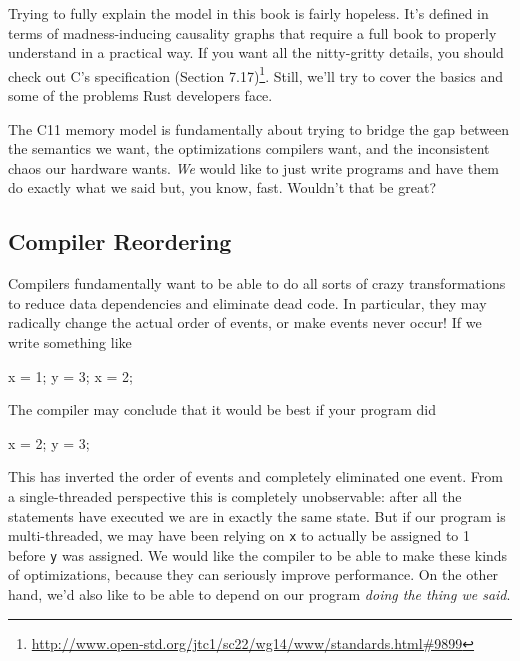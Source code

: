 \documentclass[a4paper,]{book}
\newenvironment{Shaded}{\begin{snugshade}}{\end{snugshade}}
\newcommand{\DecValTok}[1]{\textcolor[rgb]{0.00,0.00,0.81}{{#1}}}
\newcommand{\NormalTok}[1]{{#1}}
\renewcommand{\href}[2]{#2\footnote{\url{#1}}}
\begin{document}
Trying to fully explain the model in this book is fairly hopeless. It's
defined in terms of madness-inducing causality graphs that require a
full book to properly understand in a practical way. If you want all the
nitty-gritty details, you should check out
\href{http://www.open-std.org/jtc1/sc22/wg14/www/standards.html\#9899}{C's
specification (Section 7.17)}. Still, we'll try to cover the basics and
some of the problems Rust developers face.

The C11 memory model is fundamentally about trying to bridge the gap
between the semantics we want, the optimizations compilers want, and the
inconsistent chaos our hardware wants. \emph{We} would like to just
write programs and have them do exactly what we said but, you know,
fast. Wouldn't that be great?

\subsection{Compiler Reordering}\label{compiler-reordering}

Compilers fundamentally want to be able to do all sorts of crazy
transformations to reduce data dependencies and eliminate dead code. In
particular, they may radically change the actual order of events, or
make events never occur! If we write something like

\begin{Shaded}
\begin{Highlighting}[]
\NormalTok{x = }\DecValTok{1}\NormalTok{;}
\NormalTok{y = }\DecValTok{3}\NormalTok{;}
\NormalTok{x = }\DecValTok{2}\NormalTok{;}
\end{Highlighting}
\end{Shaded}

The compiler may conclude that it would be best if your program did

\begin{Shaded}
\begin{Highlighting}[]
\NormalTok{x = }\DecValTok{2}\NormalTok{;}
\NormalTok{y = }\DecValTok{3}\NormalTok{;}
\end{Highlighting}
\end{Shaded}

This has inverted the order of events and completely eliminated one
event. From a single-threaded perspective this is completely
unobservable: after all the statements have executed we are in exactly
the same state. But if our program is multi-threaded, we may have been
relying on \texttt{x} to actually be assigned to 1 before \texttt{y} was
assigned. We would like the compiler to be able to make these kinds of
optimizations, because they can seriously improve performance. On the
other hand, we'd also like to be able to depend on our program
\emph{doing the thing we said}.
\end{document}
